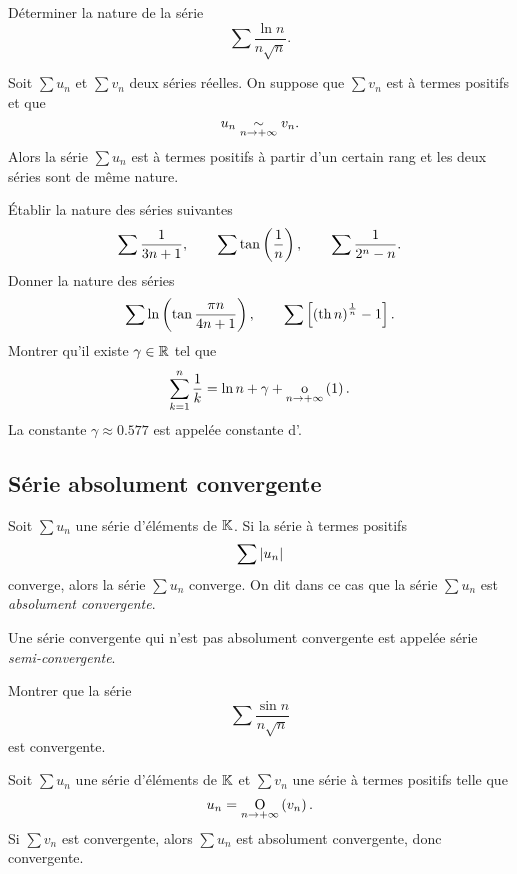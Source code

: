 \documentclass{magnolia}
\begin{document}
\begin{exoUnique}
\exo Déterminer la nature de la série
  \[\sum \frac{\ln n}{n\sqrt{n}}.\]
\end{exoUnique}

\begin{proposition}
Soit $\sum u_n$ et $\sum v_n$ deux séries réelles. On suppose que $\sum v_n$ est à termes
positifs et que
\[u_n\underset{n\rightarrow +\infty}{\sim} v_n.\]
Alors la série $\sum u_n$ est à termes positifs à partir d'un certain rang et les deux séries
sont de même nature.
\end{proposition}

\begin{exos}
\exo Établir la nature des séries suivantes
  \[\sum \frac{1}{3n+1}, \qquad\sum \tan\left(\frac{1}{n}\right), \qquad \sum \frac{1}{2^n-n}.\]
\exo Donner la nature des séries
  \[\sum \ln\left(\tan\frac{\pi n}{4n+1}\right),\qquad \sum \left[\left(\operatorname{th} n\right)^{\frac{1}{n}}-1\right].\]
\exo Montrer qu'il existe $\gamma\in\mathbb{R}$ tel que
  \[\sum_{k=1}^n \frac 1k = \ln n+ \gamma + \underset{n \rightarrow +\infty}{\text{o}}\left(1\right).\]
  La constante $\gamma\approx 0.577$ est appelée constante d'.
\end{exos}


\subsection{Série absolument convergente}

\begin{definition}
Soit $\sum u_n$ une série d'éléments de $\mathbb{K}$. Si la série à termes positifs
\[\sum \left|u_n\right|\]
converge, alors la série $\sum u_n$ converge. On dit dans ce cas que la série
$\sum u_n$ est \emph{absolument convergente}.
\end{definition}

\begin{remarqueUnique}
\remarque Une série convergente qui n'est pas absolument convergente est appelée série
  \emph{semi-convergente}.
\end{remarqueUnique}

\begin{exoUnique}
\exo Montrer que la série
  \[\sum\frac{\sin n}{n\sqrt{n}}\]
  est convergente.
\end{exoUnique}


\begin{proposition}
Soit $\sum u_n$ une série d'éléments de $\mathbb{K}$ et $\sum v_n$ une série à termes positifs
telle que
\[u_n=\underset{n \rightarrow +\infty}{\text{O}}\left(v_n\right).\]
Si $\sum v_n$ est convergente, alors $\sum u_n$ est absolument convergente, donc convergente.
\end{proposition}
\end{document}
